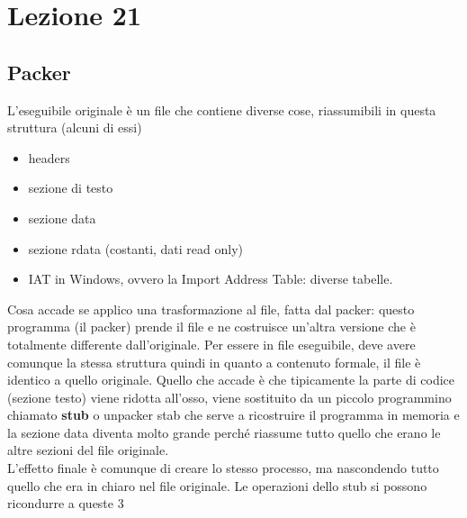 \documentclass[12pt, oneside]{extbook}
\begin{document}
\chapter{Lezione 21}
\section{Packer}
L'eseguibile originale è un file che contiene diverse cose, riassumibili in questa struttura (alcuni di essi)
\begin{itemize}
\item headers
\item sezione di testo
\item sezione data
\item sezione rdata (costanti, dati read only)
\item IAT in Windows, ovvero la Import Address Table: diverse tabelle.
\end{itemize}
Cosa accade se applico una trasformazione al file, fatta dal packer: questo programma (il packer) prende il file e ne costruisce un'altra versione che è totalmente differente dall'originale. Per essere in file eseguibile, deve avere comunque la stessa struttura quindi in quanto a contenuto formale, il file è identico a quello originale. Quello che accade è che tipicamente la parte di codice (sezione testo) viene ridotta all'osso, viene sostituito da un piccolo programmino chiamato \textbf{stub} o unpacker stab che serve a ricostruire il programma in memoria e la sezione data diventa molto grande perché riassume tutto quello che erano le altre sezioni del file originale.\\L'effetto finale è comunque di creare lo stesso processo, ma nascondendo tutto quello che era in chiaro nel file originale. Le operazioni dello stub si possono ricondurre a queste 3
\end{document}
